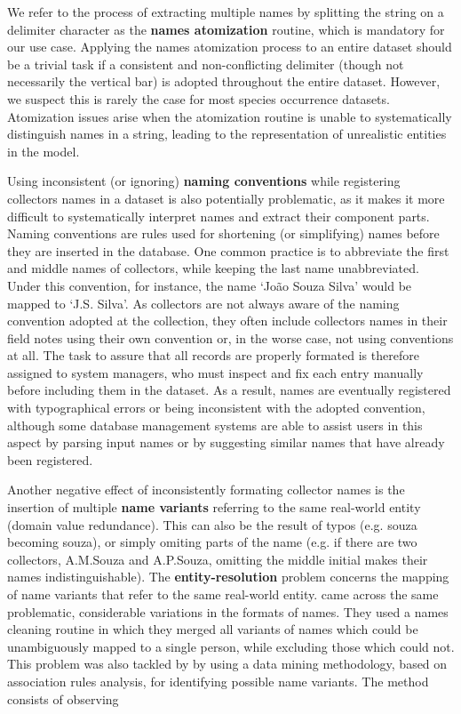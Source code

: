 We refer to the process of extracting multiple names by splitting the string on a delimiter character as the \textbf{names atomization} routine, which is mandatory for our use case.
Applying the names atomization process to an entire dataset should be a trivial task if a consistent and non-conflicting delimiter (though not necessarily the vertical bar) is adopted throughout the entire dataset.
However, we suspect this is rarely the case for most species occurrence datasets.
Atomization issues arise when the atomization routine is unable to systematically distinguish names in a string, leading to the representation of unrealistic entities in the model.

Using inconsistent (or ignoring) \textbf{naming conventions} while registering collectors names in a dataset is also potentially problematic, as it makes it more difficult to systematically interpret names and extract their component parts.
Naming conventions are rules used for shortening (or simplifying) names before they are inserted in the database.
One common practice is to abbreviate the first and middle names of collectors, while keeping the last name unabbreviated.
Under this convention, for instance, the name `João Souza Silva' would be mapped to `J.S. Silva'.
As collectors are not always aware of the naming convention adopted at the collection, they often include collectors names in their field notes using their own convention or, in the worse case, not using conventions at all.
The task to assure that all records are properly formated is therefore assigned to system managers, who must inspect and fix each entry manually before including them in the dataset.
As a result, names are eventually registered with typographical errors or being inconsistent with the adopted convention, although some database management systems are able to assist users in this aspect by parsing input names or by suggesting similar names that have already been registered.

Another negative effect of inconsistently formating collector names is the insertion of multiple \textbf{name variants} referring to the same real-world entity (domain value redundance).
This can also be the result of typos (e.g. souza becoming souza), or simply omiting parts of the name (e.g. if there are two collectors, A.M.Souza and A.P.Souza, omitting the middle initial makes their names indistinguishable).
%
The \textbf{entity-resolution} problem concerns the mapping of name variants that refer to the same real-world entity.
 came across the same problematic, considerable variations in the formats of names.
They used a names cleaning routine in which they merged all variants of names which could be unambiguously mapped to a single person, while excluding those which could not.
This problem was also tackled by  by using a data mining methodology, based on association rules analysis, for identifying possible name variants.
The method consists of observing 

